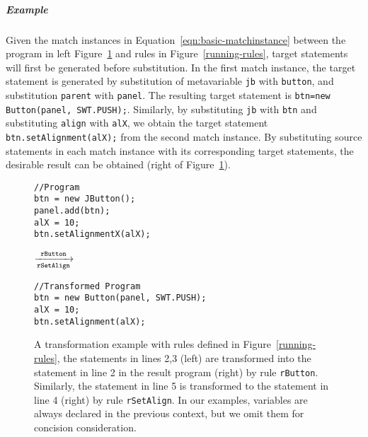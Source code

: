 \documentclass[a4paper, USenglish]{lipics-v2016}
\newenvironment{smpage}[1]
{\begin{lrbox}{\fmbox}\begin{minipage}{#1}}
{\end{minipage}\end{lrbox}\usebox{\fmbox}}
\newcommand{\code}[1]{\texttt{\footnotesize #1}}
\theoremstyle{plain}
\begin{document}
\subparagraph*{Example} Given the match instances in Equation~\ref{eqn:basic-matchinstance} between the program in left Figure~\ref{running-eg1} and rules in Figure~\ref{running-rules}, target statements will first be generated before substitution. In the first match instance, the target statement is generated by substitution of metavariable \code{jb} with \code{button}, and substitution \code{parent} with \code{panel}. The resulting target statement is \code{btn=new Button(panel, SWT.PUSH);}. Similarly, by substituting \code{jb} with \code{btn} and substituting \code{align} with \code{alX}, we obtain the target statement \code{btn.setAlignment(alX);} from the second match instance. By substituting source statements in each match instance with its corresponding target statements, the desirable result can be obtained (right of Figure~\ref{running-eg1}).

\begin{figure}[ht]
\footnotesize
\vspace{-10pt}
\begin{center}
\begin{smpage}{0.27\columnwidth}
\begin{lstlisting}[style=patl,frame=none,basicstyle=\scriptsize\ttfamily]
//Program
btn = new JButton();
panel.add(btn);
alX = 10;
btn.setAlignmentX(alX);
\end{lstlisting}
\end{smpage}
\!\!$\xrightarrow[\texttt{\scriptsize rSetAlign}]{\texttt{\scriptsize rButton}}$~~~~
\begin{smpage}{0.4\columnwidth}
\begin{lstlisting}[style=patl,frame=none, basicstyle=\scriptsize\ttfamily]
//Transformed Program
btn = new Button(panel, SWT.PUSH);
alX = 10;
btn.setAlignment(alX);
\end{lstlisting}
\end{smpage}
\end{center}
\vspace{-15pt}
\caption{A transformation example with rules defined in Figure~\ref{running-rules}, the statements in lines 2,3 (left) are transformed into the statement in line 2 in the result program (right) by rule \code{rButton}. Similarly, the statement in line 5 is transformed to the statement in line 4 (right) by rule \code{rSetAlign}. In our examples, variables are always declared in the previous context, but we omit them for concision consideration. }
\label{running-eg1}
\end{figure}
\end{document}
